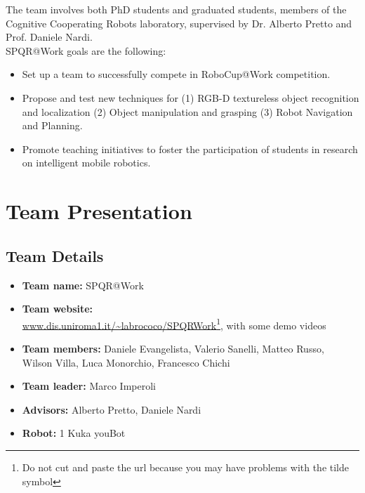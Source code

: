 \documentclass{llncs}
\begin{document}
The team involves both PhD students and graduated students, members of the Cognitive Cooperating Robots laboratory, supervised by Dr. Alberto Pretto and Prof. Daniele Nardi.\\ 

SPQR@Work goals are the following:
\begin{itemize}
 \item Set up a team to successfully compete in RoboCup@Work competition.
 \item Propose and test new techniques for (1) RGB-D textureless object recognition and localization (2) Object manipulation and grasping (3) Robot Navigation and Planning.
 \item Promote teaching initiatives to foster the participation of students in research on intelligent mobile robotics.
\end{itemize}
 
\section{Team Presentation}
\subsection{Team Details}

\begin{itemize}
 \item \textbf{Team name:} SPQR@Work
 \item \textbf{Team website:} \\\url{www.dis.uniroma1.it/~labrococo/SPQRWork}\footnote{Do not cut and paste the url because you may have problems with the tilde symbol}, with some demo videos
 \item \textbf{Team members:} Daniele Evangelista, Valerio Sanelli, Matteo Russo,\\ Wilson Villa, Luca Monorchio, Francesco Chichi
  \item \textbf{Team leader:} Marco Imperoli
 \item \textbf{Advisors:} Alberto Pretto, Daniele Nardi
 \item \textbf{Robot:} 1 Kuka youBot
\end{itemize}
\end{document}
